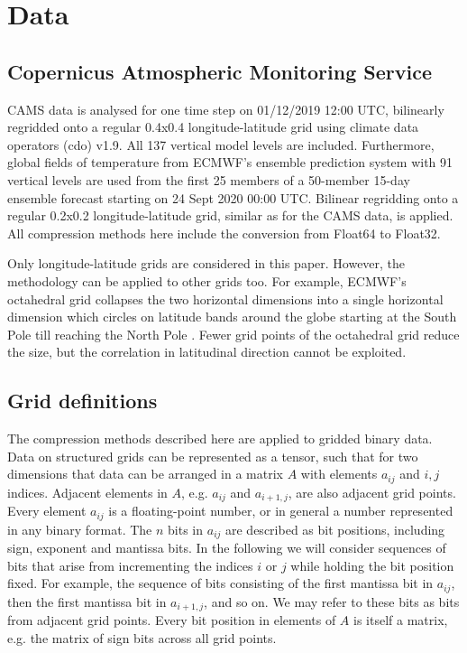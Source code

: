 \section{Data}
\label{sec:compression_data}

\subsection{Copernicus Atmospheric Monitoring Service}

CAMS data is analysed for one time step on 01/12/2019 12:00 UTC, bilinearly regridded onto a regular 0.4\textdegree{}x0.4\textdegree{}
longitude-latitude grid using climate data operators (cdo) v1.9. All 137 vertical model levels are included.
Furthermore, global fields of temperature from ECMWF’s ensemble prediction system with 91 vertical levels are
used from the first 25 members of a 50-member 15-day ensemble forecast starting on 24 Sept 2020 00:00 UTC.
Bilinear regridding onto a regular 0.2\textdegree{}x0.2\textdegree{} longitude-latitude grid, similar as for the CAMS data, is applied.
All compression methods here include the conversion from Float64 to Float32.

Only longitude-latitude grids are considered in this paper. However, the methodology can be applied to other grids too.
For example, ECMWF’s octahedral grid collapses the two horizontal dimensions into a single horizontal dimension
which circles on latitude bands around the globe starting at the South Pole till reaching the North Pole \citep{Malardel2016}.
Fewer grid points of the octahedral grid reduce the size, but the correlation in latitudinal direction cannot be exploited.

\subsection{Grid definitions}

The compression methods described here are applied to gridded binary data. Data on structured grids can be represented as a tensor,
such that for two dimensions that data can be arranged in a matrix $A$  with elements $a_{ij}$ and $i,j$ indices.
Adjacent elements in $A$, e.g. $a_{ij}$ and $a_{i+1,j}$, are also adjacent grid points. Every element $a_{ij}$ is a floating-point number,
or in general a number represented in any binary format. The $n$ bits in $a_{ij}$ are described as bit positions, including sign, exponent
and mantissa bits. In the following we will consider sequences of bits that arise from incrementing the indices $i$ or $j$ while holding the
bit position fixed. For example, the sequence of bits consisting of the first mantissa bit in $a_{ij}$, then the first mantissa bit in $a_{i+1,j}$,
and so on. We may refer to these bits as bits from adjacent grid points. Every bit position in elements of $A$ is itself a matrix, e.g.
the matrix of sign bits across all grid points.

